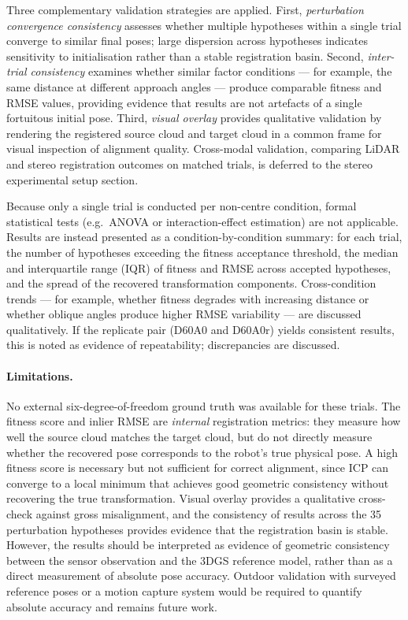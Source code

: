 Three complementary validation strategies are applied. First, \emph{perturbation convergence consistency} assesses whether multiple hypotheses within a single trial converge to similar final poses; large dispersion across hypotheses indicates sensitivity to initialisation rather than a stable registration basin. Second, \emph{inter-trial consistency} examines whether similar factor conditions --- for example, the same distance at different approach angles --- produce comparable fitness and RMSE values, providing evidence that results are not artefacts of a single fortuitous initial pose. Third, \emph{visual overlay} provides qualitative validation by rendering the registered source cloud and target cloud in a common frame for visual inspection of alignment quality. Cross-modal validation, comparing LiDAR and stereo registration outcomes on matched trials, is deferred to the stereo experimental setup section.

Because only a single trial is conducted per non-centre condition, formal statistical tests (e.g.\ ANOVA or interaction-effect estimation) are not applicable. Results are instead presented as a condition-by-condition summary: for each trial, the number of hypotheses exceeding the fitness acceptance threshold, the median and interquartile range (IQR) of fitness and RMSE across accepted hypotheses, and the spread of the recovered transformation components. Cross-condition trends --- for example, whether fitness degrades with increasing distance or whether oblique angles produce higher RMSE variability --- are discussed qualitatively. If the replicate pair (D60A0 and D60A0r) yields consistent results, this is noted as evidence of repeatability; discrepancies are discussed.

\paragraph{Limitations.}
No external six-degree-of-freedom ground truth was available for these trials. The fitness score and inlier RMSE are \emph{internal} registration metrics: they measure how well the source cloud matches the target cloud, but do not directly measure whether the recovered pose corresponds to the robot's true physical pose. A high fitness score is necessary but not sufficient for correct alignment, since ICP can converge to a local minimum that achieves good geometric consistency without recovering the true transformation. Visual overlay provides a qualitative cross-check against gross misalignment, and the consistency of results across the 35 perturbation hypotheses provides evidence that the registration basin is stable. However, the results should be interpreted as evidence of geometric consistency between the sensor observation and the 3DGS reference model, rather than as a direct measurement of absolute pose accuracy. Outdoor validation with surveyed reference poses or a motion capture system would be required to quantify absolute accuracy and remains future work.